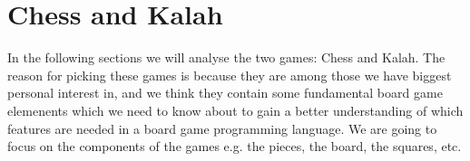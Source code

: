 \section{Chess and Kalah}
\label{sec:chessandkalah}

In the following sections we will analyse the two games: Chess and Kalah. The reason for picking these games is because they are among those we have biggest personal interest in, and we think they contain some fundamental board game elemenents which we need to know about to gain a better understanding of which features are needed in a board game programming language. We are going to focus on the components of the games e.g. the pieces, the board, the squares, etc.


  

